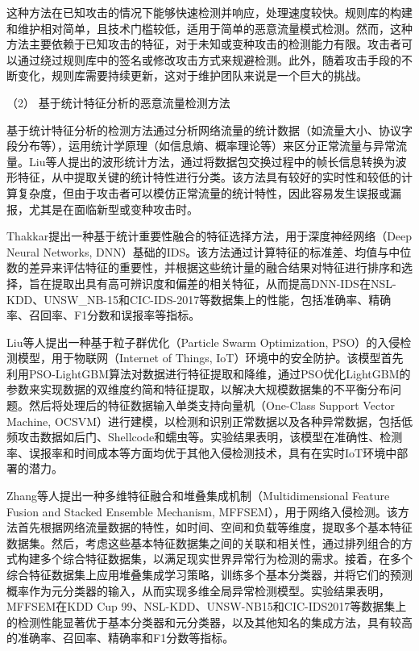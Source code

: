 \documentclass[promaster]{thesis-uestc}
\begin{document}
这种方法在已知攻击的情况下能够快速检测并响应，处理速度较快。规则库的构建和维护相对简单，且技术门槛较低，适用于简单的恶意流量模式检测。然而，这种方法主要依赖于已知攻击的特征，对于未知或变种攻击的检测能力有限。攻击者可以通过绕过规则库中的签名或修改攻击方式来规避检测。此外，随着攻击手段的不断变化，规则库需要持续更新，这对于维护团队来说是一个巨大的挑战。

（2） 基于统计特征分析的恶意流量检测方法

基于统计特征分析的检测方法通过分析网络流量的统计数据（如流量大小、协议字段分布等），运用统计学原理（如信息熵、概率理论等）来区分正常流量与异常流量。Liu等人提出的波形统计方法，通过将数据包交换过程中的帧长信息转换为波形特征，从中提取关键的统计特性进行分类。该方法具有较好的实时性和较低的计算复杂度，但由于攻击者可以模仿正常流量的统计特性，因此容易发生误报或漏报，尤其是在面临新型或变种攻击时。

Thakkar提出一种基于统计重要性融合的特征选择方法，用于深度神经网络（Deep Neural Networks, DNN）基础的IDS。该方法通过计算特征的标准差、均值与中位数的差异来评估特征的重要性，并根据这些统计量的融合结果对特征进行排序和选择，旨在提取出具有高可辨识度和偏差的相关特征，从而提高DNN-IDS在NSL-KDD、UNSW\_NB-15和CIC-IDS-2017等数据集上的性能，包括准确率、精确率、召回率、F1分数和误报率等指标。

Liu等人提出一种基于粒子群优化（Particle Swarm Optimization, PSO）的入侵检测模型，用于物联网（Internet of Things, IoT）环境中的安全防护。该模型首先利用PSO-LightGBM算法对数据进行特征提取和降维，通过PSO优化LightGBM的参数来实现数据的双维度约简和特征提取，以解决大规模数据集的不平衡分布问题。然后将处理后的特征数据输入单类支持向量机（One-Class Support Vector Machine, OCSVM）进行建模，以检测和识别正常数据以及各种异常数据，包括低频攻击数据如后门、Shellcode和蠕虫等。实验结果表明，该模型在准确性、检测率、误报率和时间成本等方面均优于其他入侵检测技术，具有在实时IoT环境中部署的潜力。

Zhang等人提出一种多维特征融合和堆叠集成机制（Multidimensional Feature Fusion and Stacked Ensemble Mechanism, MFFSEM），用于网络入侵检测。该方法首先根据网络流量数据的特性，如时间、空间和负载等维度，提取多个基本特征数据集。然后，考虑这些基本特征数据集之间的关联和相关性，通过排列组合的方式构建多个综合特征数据集，以满足现实世界异常行为检测的需求。接着，在多个综合特征数据集上应用堆叠集成学习策略，训练多个基本分类器，并将它们的预测概率作为元分类器的输入，从而实现多维全局异常检测模型。实验结果表明，MFFSEM在KDD Cup 99、NSL-KDD、UNSW-NB15和CIC-IDS2017等数据集上的检测性能显著优于基本分类器和元分类器，以及其他知名的集成方法，具有较高的准确率、召回率、精确率和F1分数等指标。
\end{document}
